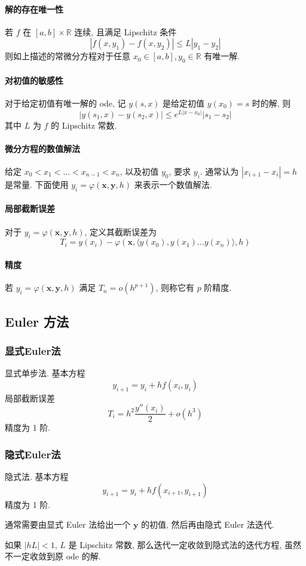 \documentclass{ctexart}
\newcommand{\Rset}{\mathbb{R}}
\begin{document}
\paragraph{解的存在唯一性}
    若 $f$ 在 $[a, b] \times \Rset$ 连续, 且满足 Lipschitz 条件 \[
        |f(x, y_1) - f(x, y_2)| \le L | y_1 - y_2|\]
    则如上描述的常微分方程对于任意 $x_0 \in [a,b], y_0 \in \Rset$ 有唯一解.
\paragraph{对初值的敏感性}
    对于给定初值有唯一解的 ode, 记 $y(s, x)$ 是给定初值 $y(x_0) = s$ 时的解,
    则 \[ |y(s_1, x) - y(s_2, x)| \le e^{L |x - x_0|} |s_1 - s_2| \]
    其中 $L$ 为 $f$ 的 Lipschitz 常数.
\paragraph{微分方程的数值解法}
    给定 $x_0 < x_1 < \ldots < x_{n-1} < x_n$, 以及初值 $y_0$, 要求
    $y_i$. 通常认为 $|x_{i+1} - x_i| = h$ 是常量.
    下面使用 $y_i = \varphi(\mathbf{x}, \mathbf{y}, h)$ 来表示一个数值解法.
\paragraph{局部截断误差}
    对于 $y_i = \varphi(\mathbf{x}, \mathbf{y}, h)$, 定义其截断误差为 \[
        T_i = y(x_i) - \varphi(\mathbf{x}, \langle y(x_0), y(x_1) \ldots y(x_n) \rangle, h) \]
\paragraph{精度}
    若 $y_i = \varphi(\mathbf{x}, \mathbf{y}, h)$ 满足 $T_n = o(h^{p+1})$, 
    则称它有 $p$ 阶精度.

\subsection{Euler 方法}
\subsubsection{显式Euler法}
    显式单步法. 基本方程\[
        y_{i+1} = y_i + h f(x_i, y_i)\]
    局部截断误差 \[
        T_i = h^2 \frac{y''(x_i)}{2} + o(h^3)\]
    精度为 1 阶.
\subsubsection{隐式Euler法}
    隐式法. 基本方程\[
        y_{i+1} = y_i + h f(x_{i+1}, y_{i+1})\]
    精度为 1 阶.\par
    通常需要由显式 Euler 法给出一个 $\mathbf{y}$ 的初值,
    然后再由隐式 Euler 法迭代.\par
    如果 $|hL| < 1$, $L$ 是 Lipschitz 常数, 那么迭代一定收敛到隐式法的迭代方程,
    虽然不一定收敛到原 ode 的解.
\end{document}
